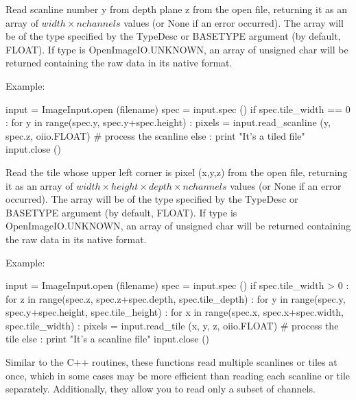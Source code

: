 Read scanline number {\cf y} from depth plane {\cf z} from the open file,
returning it as an array of $\mathit{width} \times \mathit{nchannels}$
values (or {\cf None} if an error occurred). The array will be of the type
specified by the {\cf TypeDesc} or {\cf BASETYPE} argument (by default,
{\cf FLOAT}). If {\cf type} is {\cf OpenImageIO.UNKNOWN}, an
array of {\cf unsigned char} will be returned containing the raw data in
its native format.

\noindent Example:
\begin{code}
    input = ImageInput.open (filename)
    spec = input.spec ()
    if spec.tile_width == 0 :
        for y in range(spec.y, spec.y+spec.height) :
            pixels = input.read_scanline (y, spec.z, oiio.FLOAT)
            # process the scanline
    else :
        print "It's a tiled file"
    input.close ()
\end{code}
\apiend

Read the tile whose upper left corner is pixel {\cf (x,y,z)} from the open
file, returning it as an array of
$\mathit{width} \times \mathit{height} \times \mathit{depth} \times \mathit{nchannels}$
values (or {\cf None} if an error occurred). The array will be of the type
specified by the {\cf TypeDesc} or {\cf BASETYPE} argument (by default,
{\cf FLOAT}). If {\cf type} is {\cf OpenImageIO.UNKNOWN}, an
array of {\cf unsigned char} will be returned containing the raw data in
its native format.

\noindent Example:
\begin{code}
    input = ImageInput.open (filename)
    spec = input.spec ()
    if spec.tile_width > 0 :
        for z in range(spec.z, spec.z+spec.depth, spec.tile_depth) :
            for y in range(spec.y, spec.y+spec.height, spec.tile_height) :
                for x in range(spec.x, spec.x+spec.width, spec.tile_width) :
                    pixels = input.read_tile (x, y, z, oiio.FLOAT)
                    # process the tile
    else :
        print "It's a scanline file"
    input.close ()
\end{code}
\apiend

Similar to the C++ routines, these functions read multiple scanlines or 
tiles at once, which in some cases may be more efficient than reading
each scanline or tile separately.  Additionally, they allow you to read only
a subset of channels.


